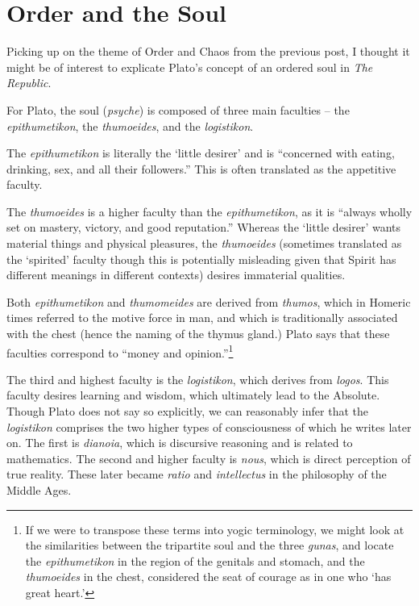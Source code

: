 \section{Order and the Soul}

Picking up on the theme of Order and Chaos from the previous post, I thought it might be of interest to explicate Plato's concept of an ordered soul in \emph{The Republic}.

For Plato, the soul (\emph{psyche}) is composed of three main faculties -- the \emph{epithumetikon}, the \emph{thumoeides}, and the \emph{logistikon}.

The \emph{epithumetikon} is literally the `little desirer' and is ``concerned with eating, drinking, sex, and all their followers.'' This is often translated as the appetitive faculty.

The \emph{thumoeides} is a higher faculty than the \emph{epithumetikon}, as it is ``always wholly set on mastery, victory, and good reputation.'' Whereas the `little desirer' wants material things and physical pleasures, the \emph{thumoeides} (sometimes translated as the `spirited' faculty though this is potentially misleading given that Spirit has different meanings in different contexts) desires immaterial qualities.

Both \emph{epithumetikon} and \emph{thumomeides} are derived from \emph{thumos}, which in Homeric times referred to the motive force in man, and which is traditionally associated with the chest (hence the naming of the thymus gland.) Plato says that these faculties correspond to ``money and opinion.''\footnote{If we were to transpose these terms into yogic terminology, we might look at the similarities between the tripartite soul and the three \emph{gunas}, and locate the \emph{epithumetikon} in the region of the genitals and stomach, and the \emph{thumoeides} in the chest, considered the seat of courage as in one who `has great heart.'}

The third and highest faculty is the \emph{logistikon}, which derives from \emph{logos}. This faculty desires learning and wisdom, which ultimately lead to the Absolute. Though Plato does not say so explicitly, we can reasonably infer that the \emph{logistikon} comprises the two higher types of consciousness of which he writes later on. The first is \emph{dianoia}, which is discursive reasoning and is related to mathematics. The second and higher faculty is \emph{nous}, which is direct perception of true reality. These later became \emph{ratio} and \emph{intellectus} in the philosophy of the Middle Ages.


